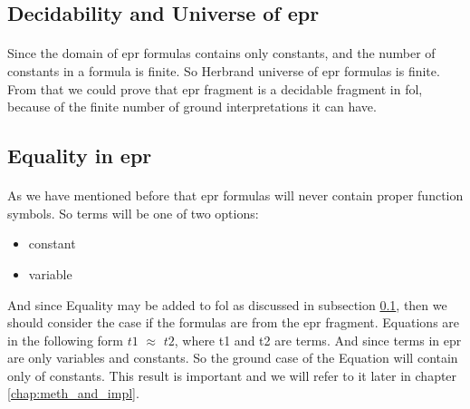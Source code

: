 \subsection{Decidability and Universe of \ac{epr}}\label{sub:c2s2s3}
\paragraph{}
Since the domain of \ac{epr} formulas contains only constants, and the number of constants in a formula is finite. So Herbrand universe of \ac{epr} formulas is finite. From that we could prove that \ac{epr} fragment is a decidable fragment in \ac{fol}, because of the finite number of ground interpretations it can have.


\subsection{Equality in \ac{epr}}\label{sub:c2s2s4}
\paragraph{}
As we have mentioned before that \ac{epr} formulas will never contain proper function symbols. So terms will be one of two options:
\begin{itemize}
	\item constant
	\item variable
\end{itemize}


And since Equality may be added to \ac{fol} as discussed in subsection \ref{sub:c2s2s3}, then we should consider the case if the formulas are from the \ac{epr} fragment. Equations are in the following form $t1$ $\approx$ $t2$, where t1 and t2 are terms. And since terms in \ac{epr} are only variables and constants. So the ground case of the Equation will contain only of constants. This result is important and we will refer to it later in chapter \ref{chap:meth_and_impl}.
 
